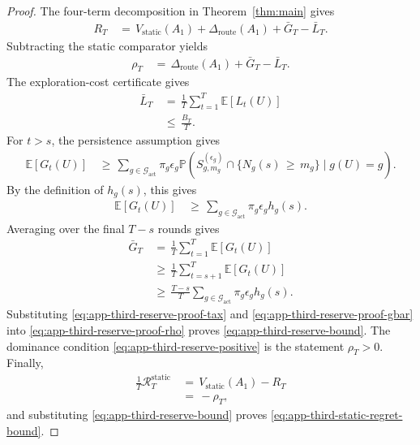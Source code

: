 \documentclass{article} %
\begin{document}
\begin{proof}
The four-term decomposition in Theorem~\ref{thm:main} gives
\begin{align}
\label{eq:app-third-reserve-proof-main}
R_T
&\,=\,
V_{\mathrm{static}}(A_1)
+
\Delta_{\mathrm{route}}(A_1)
+
\bar G_T
-
\bar L_T.
\end{align}
Subtracting the static comparator yields
\begin{align}
\label{eq:app-third-reserve-proof-rho}
\rho_T
&\,=\,
\Delta_{\mathrm{route}}(A_1)
+
\bar G_T
-
\bar L_T.
\end{align}
The exploration-cost certificate gives
\begin{align}
\label{eq:app-third-reserve-proof-tax}
\bar L_T
&\,=\,
\frac{1}{T}
\sum_{t=1}^{T}
\mathbb{E}[L_t(U)]
\\
&\,\le\,
\frac{B_T}{T}.
\end{align}
For \(t>s\), the persistence assumption gives
\begin{align}
\label{eq:app-third-reserve-proof-discovery-t}
\mathbb{E}[G_t(U)]
&\,\ge\,
\sum_{g\in\mathcal{G}_{\mathrm{act}}}
\pi_g
\epsilon_g
\mathbb{P}\!\left(
S_{g,m_g}^{(\epsilon_g)}
\cap
\{N_g(s)\,\ge\, m_g\}
\mid
g(U)=g
\right).
\end{align}
By the definition of $h_g(s)$, this gives
\begin{align}
\label{eq:app-third-reserve-proof-discovery-t-final}
\mathbb{E}[G_t(U)]
&\,\ge\,
\sum_{g\in\mathcal{G}_{\mathrm{act}}}
\pi_g
\epsilon_g
h_g(s).
\end{align}
Averaging over the final \(T-s\) rounds gives
\begin{align}
\label{eq:app-third-reserve-proof-gbar}
\bar G_T
&\,=\,
\frac{1}{T}
\sum_{t=1}^{T}
\mathbb{E}[G_t(U)]
\\
&\,\ge\,
\frac{1}{T}
\sum_{t=s+1}^{T}
\mathbb{E}[G_t(U)]
\\
&\,\ge\,
\frac{T-s}{T}
\sum_{g\in\mathcal{G}_{\mathrm{act}}}
\pi_g
\epsilon_g
h_g(s).
\end{align}
Substituting \eqref{eq:app-third-reserve-proof-tax} and \eqref{eq:app-third-reserve-proof-gbar} into \eqref{eq:app-third-reserve-proof-rho} proves \eqref{eq:app-third-reserve-bound}.  The dominance condition \eqref{eq:app-third-reserve-positive} is the statement \(\rho_T>0\).  Finally,
\begin{align}
\label{eq:app-third-reserve-proof-static-regret}
\frac{1}{T}
\mathcal{R}_{T}^{\mathrm{static}}
&\,=\,
V_{\mathrm{static}}(A_1)
-
R_T
\\
&\,=\,
-\rho_T,
\end{align}
and substituting \eqref{eq:app-third-reserve-bound} proves \eqref{eq:app-third-static-regret-bound}.
\end{proof}
\end{document}
